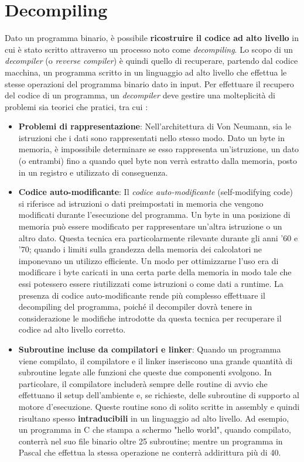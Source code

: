 \documentclass[../main.tex]{subfiles}
\begin{document}
\section{Decompiling}
Dato un programma binario, è possibile \textbf{ricostruire il codice ad alto livello} in cui è stato scritto attraverso un processo noto come \textit{decompiling}.
Lo scopo di un \textit{decompiler} (o \textit{reverse compiler}) è quindi quello di recuperare, partendo dal codice macchina, un programma scritto in un linguaggio ad alto livello che effettua le stesse
operazioni del programma binario dato in input. Per effettuare il recupero del codice di un programma, un \textit{decompiler} deve gestire una molteplicità di problemi sia teorici che pratici, tra cui \cite{Cifuentes1994ReverseCT}:
\begin{itemize}
    \item \textbf{Problemi di rappresentazione}: Nell'architettura di Von Neumann, sia le istruzioni che i dati sono rappresentati nello stesso modo. Dato un byte in memoria, è impossibile determinare se esso rappresenta un'istruzione, un dato (o entrambi) fino a quando quel byte non verrà estratto dalla memoria, posto in un registro e utilizzato di conseguenza.
    \item \textbf{Codice auto-modificante}: Il \textit{codice auto-modificante} (self-modifying code) si riferisce ad istruzioni o dati preimpostati in memoria che vengono modificati durante l'esecuzione del programma. Un byte in una posizione di memoria può essere modificato per rappresentare un'altra istruzione o un altro dato. Questa tecnica era particolarmente rilevante durante gli anni '60 e '70; quando
    i limiti sulla grandezza della memoria dei calcolatori ne imponevano un utilizzo efficiente. Un modo per ottimizzarne l'uso era di modificare i byte caricati in una certa parte della memoria in modo tale che essi potessero essere riutilizzati come istruzioni o come dati a runtime. La presenza di codice auto-modificante rende più complesso effettuare il decompiling del programma, poiché il decompiler
    dovrà tenere in considerazione le modifiche introdotte da questa tecnica per recuperare il codice ad alto livello corretto.
    \item \textbf{Subroutine incluse da compilatori e linker}: Quando un programma viene compilato, il compilatore e il linker inseriscono una grande quantità di subroutine legate alle funzioni che queste due componenti svolgono.
    In particolare, il compilatore includerà sempre delle routine di avvio che effettuano il setup dell'ambiente e, se richieste, delle subroutine di supporto al motore d'esecuzione. 
    Queste routine sono di solito scritte in assembly e quindi risultano spesso \textbf{intraducibili} in un linguaggio ad alto livello. 
    Ad esempio, un programma in C che stampa a schermo "hello world", quando compilato, conterrà nel suo file binario oltre 25 subroutine; 
    mentre un programma in Pascal che effettua la stessa operazione ne conterrà addirittura più di 40.
\end{itemize}
\end{document}
